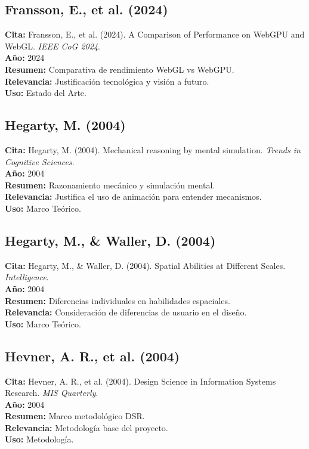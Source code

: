 \subsection*{Fransson, E., et al. (2024)}
\textbf{Cita:} Fransson, E., et al. (2024). A Comparison of Performance on WebGPU and WebGL. \textit{IEEE CoG 2024}. \\
\textbf{Año:} 2024 \\
\textbf{Resumen:} Comparativa de rendimiento WebGL vs WebGPU. \\
\textbf{Relevancia:} Justificación tecnológica y visión a futuro. \\
\textbf{Uso:} Estado del Arte.

\subsection*{Hegarty, M. (2004)}
\textbf{Cita:} Hegarty, M. (2004). Mechanical reasoning by mental simulation. \textit{Trends in Cognitive Sciences}. \\
\textbf{Año:} 2004 \\
\textbf{Resumen:} Razonamiento mecánico y simulación mental. \\
\textbf{Relevancia:} Justifica el uso de animación para entender mecanismos. \\
\textbf{Uso:} Marco Teórico.

\subsection*{Hegarty, M., \& Waller, D. (2004)}
\textbf{Cita:} Hegarty, M., \& Waller, D. (2004). Spatial Abilities at Different Scales. \textit{Intelligence}. \\
\textbf{Año:} 2004 \\
\textbf{Resumen:} Diferencias individuales en habilidades espaciales. \\
\textbf{Relevancia:} Consideración de diferencias de usuario en el diseño. \\
\textbf{Uso:} Marco Teórico.

\subsection*{Hevner, A. R., et al. (2004)}
\textbf{Cita:} Hevner, A. R., et al. (2004). Design Science in Information Systems Research. \textit{MIS Quarterly}. \\
\textbf{Año:} 2004 \\
\textbf{Resumen:} Marco metodológico DSR. \\
\textbf{Relevancia:} Metodología base del proyecto. \\
\textbf{Uso:} Metodología.

